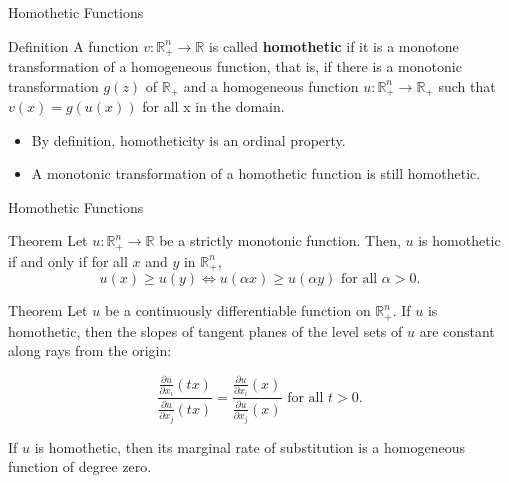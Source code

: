 \documentclass{beamer}
\begin{document}
\begin{frame}{Homothetic Functions}
    \begin{block}{Definition}
    A function $v:\mathbb{R}_+^n\to \mathbb{R}$ is called \textbf{homothetic} if it is a monotone transformation of a homogeneous function, that is, if there is a monotonic transformation $g(z)$ of $\mathbb{R}_+$ and a homogeneous function $u:\mathbb{R}_+^n\to \mathbb{R}_+$ such that $v(x)=g(u(x))$ for all x in the domain. 
    \end{block}
    \begin{itemize}
        \item By definition, homotheticity is an ordinal property. 
        \item A monotonic transformation of a homothetic function is still homothetic.
    \end{itemize}
    \end{frame}

\begin{frame}{Homothetic Functions}
\begin{block}{Theorem}
Let $u: \mathbb{R}_+^n\to \mathbb{R}$ be a strictly monotonic function. Then, $u$ is homothetic if and only if for all $x$ and $y$ in $\mathbb{R}_+^n$, 
\[u(x)\geq u(y) \iff u(\alpha x)\geq u(\alpha y) \text{ for all }\alpha>0.
\]
\end{block}
\begin{block}{Theorem}
Let $u$ be a continuously differentiable function on $\mathbb{R}_+^n$. If $u$ is homothetic, then the slopes of tangent planes of the level sets of $u$ are constant along rays from the origin:

\[\frac{\frac{\partial u}{\partial x_i}(tx)}{\frac{\partial u}{\partial x_j}(tx)}=\frac{\frac{\partial u}{\partial x_i}(x)}{\frac{\partial u}{\partial x_j}(x)} \text{ for all }t>0.
\]
\end{block}
If $u$ is homothetic, then its marginal rate of substitution is a homogeneous function of degree zero.
\end{frame}
\end{document}
